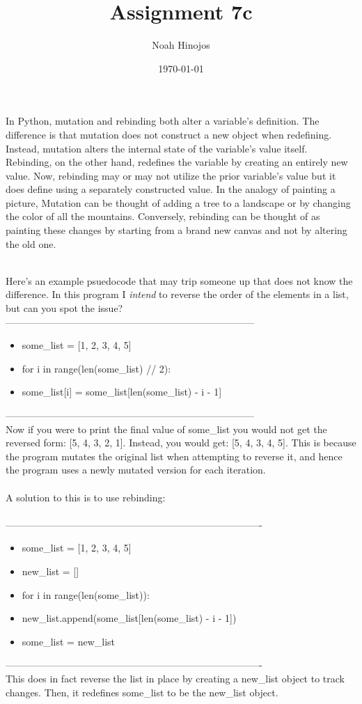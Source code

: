 \documentclass[12pt]{article}
\title{\textbf{Assignment 7c}}
\author{Noah Hinojos}
\date{\today}
\begin{document}
\maketitle

In Python, mutation and rebinding both alter a variable's definition. The difference is that mutation does not construct a new object when redefining. Instead, mutation alters the internal state of the variable's value itself. Rebinding, on the other hand, redefines the variable by creating an entirely new value. Now, rebinding may or may not utilize the prior variable's value but it does define using a separately constructed value. In the analogy of painting a picture, Mutation can be thought of adding a tree to a landscape or by changing the color of all the mountains. Conversely, rebinding can be thought of as painting these changes by starting from a brand new canvas and not by altering the old one. 


\newblock
\\
Here's an example psuedocode that may trip someone up that does not know the difference. In this program I \textit{intend} to reverse the order of the elements in a list, but can you spot the issue?
\\
-----------------------------------------------------------------------------
\begin{itemize}
  \item [] some\_list = [1, 2, 3, 4, 5]
  \item [] for i in range(len(some\_list) // 2):
  \item [] \hspace{10mm} some\_list[i] = some\_list[len(some\_list) - i - 1]
\end{itemize}
-----------------------------------------------------------------------------
\\
Now if you were to print the final value of some\_list you would not get the reversed form: [5, 4, 3, 2, 1]. Instead, you would get: [5, 4, 3, 4, 5]. This is because the program mutates the original list when attempting to reverse it, and hence the program uses a newly mutated version for each iteration. 
\\ \\
A solution to this is to use rebinding:
\\ \\
-------------------------------------------------------------------------------
\begin{itemize}
  \item [] some\_list = [1, 2, 3, 4, 5]
  \item [] new\_list = []
  \item [] for i in range(len(some\_list)):
  \item [] \hspace{10mm} new\_list.append(some\_list[len(some\_list) - i - 1])
  \item [] some\_list = new\_list
\end{itemize}
-------------------------------------------------------------------------------
\\
This does in fact reverse the list in place by creating a new\_list object to track changes. Then, it redefines some\_list to be the new\_list object.
\end{document}

